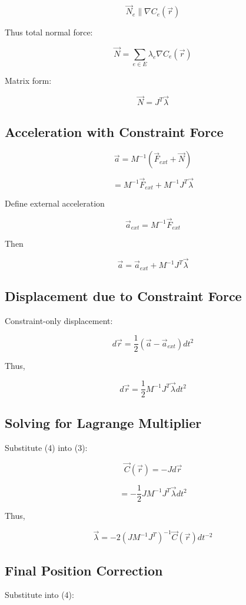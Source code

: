 \[
\vec{N}_e \parallel \nabla C_e(\vec{r})
\]

Thus total normal force:

\[
\vec{N}
=
\sum_{e \in E}
\lambda_e \nabla C_e(\vec{r})
\]

Matrix form:

\[
\vec{N}
=
J^T \vec{\lambda}
\]

\subsection*{Acceleration with Constraint Force}

\[
\vec{a}
=
M^{-1}
(\vec{F}_{ext} + \vec{N})
\]

\[
=
M^{-1} \vec{F}_{ext}
+
M^{-1} J^T \vec{\lambda}
\]

Define external acceleration

\[
\vec{a}_{ext}
=
M^{-1} \vec{F}_{ext}
\]

Then

\[
\vec{a}
=
\vec{a}_{ext}
+
M^{-1} J^T \vec{\lambda}
\]

\subsection*{Displacement due to Constraint Force}

Constraint-only displacement:

\[
d\vec{r}
=
\frac{1}{2}
(\vec{a} - \vec{a}_{ext})
dt^2
\]

Thus,

\[
d\vec{r}
=
\frac{1}{2}
M^{-1}
J^T
\vec{\lambda}
dt^2
\tag{4}
\]

\subsection*{Solving for Lagrange Multiplier}

Substitute (4) into (3):

\[
\vec{C}(\vec{r})
=
-
J d\vec{r}
\]

\[
=
-
\frac{1}{2}
J M^{-1} J^T
\vec{\lambda}
dt^2
\]

Thus,

\[
\vec{\lambda}
=
-2
\left(
J M^{-1} J^T
\right)^{-1}
\vec{C}(\vec{r})
dt^{-2}
\]

\subsection*{Final Position Correction}

Substitute into (4):

